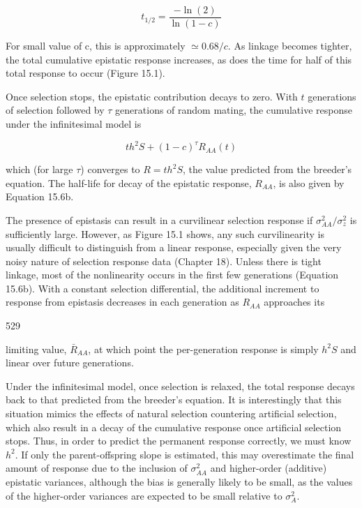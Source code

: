 \documentclass{article}
\begin{document}
\begin{equation}
t_{1/2}=\frac{-\ln(2)}{\ln(1-c)}
\tag{15.6b}
\label{eq:15_6b}
\end{equation}

For small value of c, this is approximately  $ \simeq 0.68/c $. As linkage becomes tighter, the total cumulative epistatic response increases, as does the time for half of this total response to occur (Figure 15.1).

Once selection stops, the epistatic contribution decays to zero. With  $ t $ generations of selection followed by  $ \tau $ generations of random mating, the cumulative response under the infinitesimal model is

\begin{equation}
t h^{2}S+(1-c)^{\tau}R_{A A}(t)
\tag{15.7}
\label{eq:15_7}
\end{equation}

which (for large  $ \tau $) converges to  $ R = t h^2 S $, the value predicted from the breeder's equation. The half-life for decay of the epistatic response,  $ R_{AA} $, is also given by Equation 15.6b.

The presence of epistasis can result in a curvilinear selection response if  $ \sigma_{AA}^{2}/\sigma_{z}^{2} $ is sufficiently large. However, as Figure 15.1 shows, any such curvilinearity is usually difficult to distinguish from a linear response, especially given the very noisy nature of selection response data (Chapter 18). Unless there is tight linkage, most of the nonlinearity occurs in the first few generations (Equation 15.6b). With a constant selection differential, the additional increment to response from epistasis decreases in each generation as  $ R_{AA} $ approaches its

529

limiting value,  $ \bar{R}_{AA} $, at which point the per-generation response is simply  $ h^{2}S $ and linear over future generations.

Under the infinitesimal model, once selection is relaxed, the total response decays back to that predicted from the breeder's equation. It is interestingly that this situation mimics the effects of natural selection countering artificial selection, which also result in a decay of the cumulative response once artificial selection stops. Thus, in order to predict the permanent response correctly, we must know  $ h^2 $. If only the parent-offspring slope is estimated, this may overestimate the final amount of response due to the inclusion of  $ \sigma_{AA}^2 $ and higher-order (additive) epistatic variances, although the bias is generally likely to be small, as the values of the higher-order variances are expected to be small relative to  $ \sigma_A^2 $.
\end{document}
